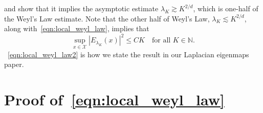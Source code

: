 \documentclass{article}
\newcommand{\1}{\mathbf{1}}
\newcommand{\mc}[1]{\mathcal{#1}}
\theoremstyle{definition}
\theoremstyle{remark}
\begin{document}
and show that it implies the asymptotic estimate $\lambda_K \gtrsim K^{2/d}$, which is one-half of the Weyl's Law estimate. Note that the other half of Weyl's Law, $\lambda_K \lesssim K^{2/d}$, along with~\eqref{eqn:local_weyl_law}, implies that 
\begin{equation}
\label{eqn:local_weyl_law2}
\sup_{x \in \mc{X}} |E_{\lambda_K}(x)|^2 \leq C K \quad \textrm{for all $K \in \mathbb{N}$.}
\end{equation}
~\eqref{eqn:local_weyl_law2} is how we state the result in our Laplacian eigenmaps paper.

\section{Proof of~\eqref{eqn:local_weyl_law}}
\end{document}
